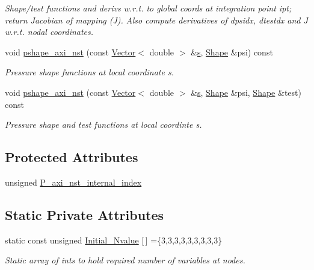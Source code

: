 \begin{DoxyCompactItemize}
\begin{DoxyCompactList}\small\item\em Shape/test functions and derivs w.\+r.\+t. to global coords at integration point ipt; return Jacobian of mapping (J). Also compute derivatives of dpsidx, dtestdx and J w.\+r.\+t. nodal coordinates. \end{DoxyCompactList}\item 
void \hyperlink{classoomph_1_1GeneralisedNewtonianAxisymmetricQCrouzeixRaviartElement_a06e8ec5317b4d6a746eaec17c65a2787}{pshape\+\_\+axi\+\_\+nst} (const \hyperlink{classoomph_1_1Vector}{Vector}$<$ double $>$ \&\hyperlink{cfortran_8h_ab7123126e4885ef647dd9c6e3807a21c}{s}, \hyperlink{classoomph_1_1Shape}{Shape} \&psi) const
\begin{DoxyCompactList}\small\item\em Pressure shape functions at local coordinate s. \end{DoxyCompactList}\item 
void \hyperlink{classoomph_1_1GeneralisedNewtonianAxisymmetricQCrouzeixRaviartElement_aecfd9564c4afe408d610c7426c47ccf1}{pshape\+\_\+axi\+\_\+nst} (const \hyperlink{classoomph_1_1Vector}{Vector}$<$ double $>$ \&\hyperlink{cfortran_8h_ab7123126e4885ef647dd9c6e3807a21c}{s}, \hyperlink{classoomph_1_1Shape}{Shape} \&psi, \hyperlink{classoomph_1_1Shape}{Shape} \&test) const
\begin{DoxyCompactList}\small\item\em Pressure shape and test functions at local coordinte s. \end{DoxyCompactList}\end{DoxyCompactItemize}
\subsection*{Protected Attributes}
\begin{DoxyCompactItemize}
\item 
unsigned \hyperlink{classoomph_1_1GeneralisedNewtonianAxisymmetricQCrouzeixRaviartElement_ae3368d8be1a8378b3d0a61c5bc598f1f}{P\+\_\+axi\+\_\+nst\+\_\+internal\+\_\+index}
\end{DoxyCompactItemize}
\subsection*{Static Private Attributes}
\begin{DoxyCompactItemize}
\item 
static const unsigned \hyperlink{classoomph_1_1GeneralisedNewtonianAxisymmetricQCrouzeixRaviartElement_a7203020ddab5ddeb67a3957483bd41dc}{Initial\+\_\+\+Nvalue} \mbox{[}$\,$\mbox{]} =\{3,3,3,3,3,3,3,3,3\}
\begin{DoxyCompactList}\small\item\em Static array of ints to hold required number of variables at nodes. \end{DoxyCompactList}\end{DoxyCompactItemize}
